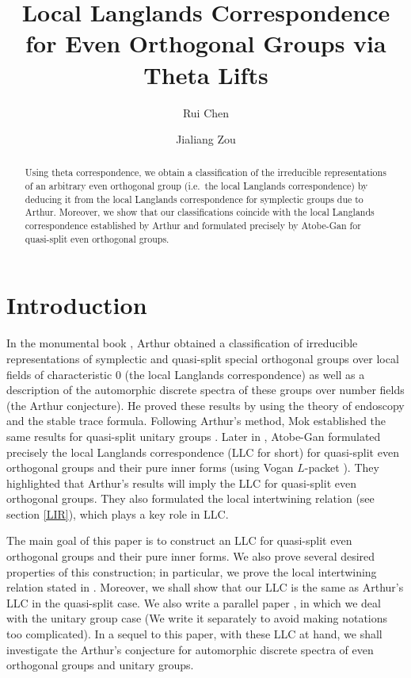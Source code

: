 \documentclass[article]{article}
\numberwithin{equation}{section}
\theoremstyle{definition}
\begin{document}
\title{Local Langlands Correspondence for Even Orthogonal Groups via Theta Lifts}
\author{Rui Chen \and Jialiang Zou}
\maketitle

\begin{abstract}
Using theta correspondence, we obtain a classification of the irreducible representations of an arbitrary even orthogonal group (i.e.\ the local Langlands correspondence) by deducing it from the local Langlands correspondence for symplectic groups due to Arthur. Moreover, we show that our classifications coincide with the local Langlands correspondence established by Arthur \cite{MR3135650} and formulated precisely by Atobe-Gan \cite{MR3708200} for quasi-split even orthogonal groups. 
\end{abstract}

\section{Introduction}
In the monumental book \cite{MR3135650}, Arthur obtained a classification of irreducible representations of symplectic and quasi-split special orthogonal groups over local fields
of characteristic 0 (the local Langlands correspondence) as well as a description of the automorphic discrete spectra of these groups over number fields (the Arthur conjecture). He proved these results by using the theory of endoscopy and the stable trace formula. Following Arthur's method, Mok established the same
results for quasi-split unitary groups \cite{MR3338302}. Later in \cite{MR3708200}, Atobe-Gan formulated precisely the local Langlands correspondence (LLC for short) for quasi-split even orthogonal groups and their pure inner forms (using Vogan $L$-packet \cite{MR1216197}). They highlighted that Arthur's results will imply the LLC for quasi-split even orthogonal groups. They also formulated the local intertwining relation (see section \ref{LIR}), which plays a key role in LLC. 

The main goal of this paper is to construct an LLC for quasi-split even orthogonal groups and their pure inner forms. We also prove several desired properties of this construction; in particular, we prove the local intertwining relation stated in \cite[\S 3.7]{MR3708200}. Moreover, we shall show that our LLC is the same as Arthur's LLC in the quasi-split case. We also write a parallel paper \cite{CZ2}, in which we deal with the unitary group case (We write it separately to avoid making notations too complicated). In a sequel to this paper, with these LLC at hand, we shall investigate the Arthur's conjecture for automorphic discrete spectra of even orthogonal groups and unitary groups. 
\end{document}
